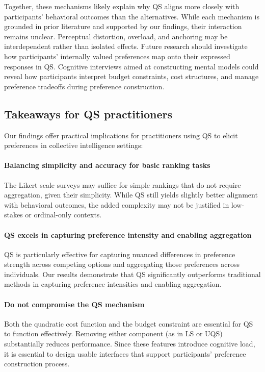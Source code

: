 Together, these mechanisms likely explain why QS aligns more closely with participants' behavioral outcomes than the alternatives. While each mechanism is grounded in prior literature and supported by our findings, their interaction remains unclear. Perceptual distortion, overload, and anchoring may be interdependent rather than isolated effects. Future research should investigate how participants' internally valued preferences map onto their expressed responses in QS. Cognitive interviews aimed at constructing mental models could reveal how participants interpret budget constraints, cost structures, and manage preference tradeoffs during preference construction.

\subsection{Takeaways for QS practitioners}
Our findings offer practical implications for practitioners using QS to elicit preferences in collective intelligence settings:

\paragraph{Balancing simplicity and accuracy for basic ranking tasks}
The Likert scale surveys may suffice for simple rankings that do not require aggregation, given their simplicity. While QS still yields slightly better alignment with behavioral outcomes, the added complexity may not be justified in low-stakes or ordinal-only contexts.

\paragraph{QS excels in capturing preference intensity and enabling aggregation}
QS is particularly effective for capturing nuanced differences in preference strength across competing options and aggregating those preferences across individuals. Our results demonstrate that QS significantly outperforms traditional methods in capturing preference intensities and enabling aggregation.

\paragraph{Do not compromise the QS mechanism}
Both the quadratic cost function and the budget constraint are essential for QS to function effectively. Removing either component (as in LS or UQS) substantially reduces performance. Since these features introduce cognitive load, it is essential to design usable interfaces that support participants' preference construction process.

